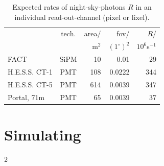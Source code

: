 \documentclass{article}%
\begin{document}
\begin{multicols}{2}
\begin{table}[H]
\begin{center}
\begin{tabular}{lcrrr}
        &tech.& area/ & fov/&$R$/\\
        &     & m$^2$ & $(1^\circ)^{2}$&$10^6$s$^{-1}$\\
      \hline
      FACT &SiPM& 10 & 0.01 & 29\\
      H.E.S.S. CT-1 &PMT& 108 & 0.0222 & 344\\
      H.E.S.S. CT-5 &PMT& 614 & 0.0039 & 347\\
      Portal, 71m &PMT& 65 & 0.0039 & 37\\
    \end{tabular}
    \caption{Expected rates of night-sky-photons $R$ in an individual read-out-channel (pixel or lixel).}
    \label{TabInstrumentsNsbRates}
  \end{center}
\end{table}
%
\section*{Simulating}%
\label{SecSimulating}%
%
%
%
\end{multicols}{2}%
\end{document}
